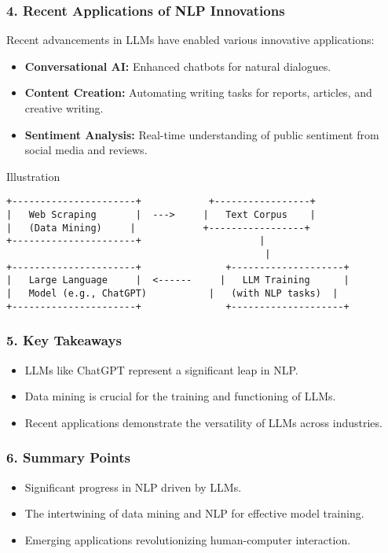 \documentclass[aspectratio=169]{beamer}
\begin{document}
\begin{frame}[fragile]
    \frametitle{4. Recent Applications of NLP Innovations}
    Recent advancements in LLMs have enabled various innovative applications:
    \begin{itemize}
        \item \textbf{Conversational AI:} Enhanced chatbots for natural dialogues.
        \item \textbf{Content Creation:} Automating writing tasks for reports, articles, and creative writing.
        \item \textbf{Sentiment Analysis:} Real-time understanding of public sentiment from social media and reviews.
    \end{itemize}
    \begin{block}{Illustration}
        \begin{center}
        \begin{verbatim}
+----------------------+            +-----------------+
|   Web Scraping       |  --->     |   Text Corpus    |
|   (Data Mining)     |            +-----------------+
+----------------------+                     |
                                              |
+----------------------+               +--------------------+
|   Large Language     |  <------     |   LLM Training      |
|   Model (e.g., ChatGPT)           |   (with NLP tasks)  |
+----------------------+               +--------------------+
        \end{verbatim}
        \end{center}
    \end{block}
\end{frame}

\begin{frame}[fragile]
    \frametitle{5. Key Takeaways}
    \begin{itemize}
        \item LLMs like ChatGPT represent a significant leap in NLP.
        \item Data mining is crucial for the training and functioning of LLMs.
        \item Recent applications demonstrate the versatility of LLMs across industries.
    \end{itemize}
\end{frame}

\begin{frame}[fragile]
    \frametitle{6. Summary Points}
    \begin{itemize}
        \item Significant progress in NLP driven by LLMs.
        \item The intertwining of data mining and NLP for effective model training.
        \item Emerging applications revolutionizing human-computer interaction.
    \end{itemize}
\end{frame}
\end{document}
